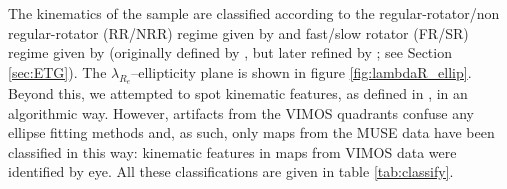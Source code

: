 		
		The kinematics of the sample are classified according to the regular-rotator/non regular-rotator (RR/NRR) regime given by \citet{Krajnovic2011} and fast/slow rotator (FR/SR) regime given by \citet{Cappellari2016} (originally defined by \citealt{Emsellem2011}, but later refined by \citealt{Cappellari2016}; see Section \ref{sec:ETG}). The $\lambda_{R_e}$--ellipticity plane is shown in figure \ref{fig:lambdaR_ellip}. Beyond this, we attempted to spot kinematic features, as defined in \citet{Krajnovic2011}, in an algorithmic way. However, artifacts from the VIMOS quadrants confuse any ellipse fitting methods and, as such, only maps from the MUSE data have been classified in this way: kinematic features in maps from VIMOS data were identified by eye. All these classifications are given in table \ref{tab:classify}. 


